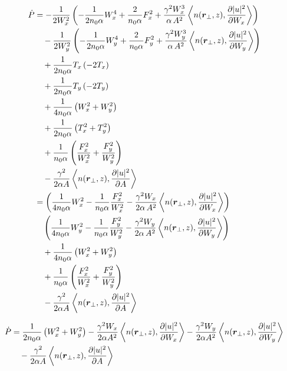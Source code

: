 \begin{equation}
\begin{split}
    \dot{P}  &= -\frac{1}{2W_{x}^2} \left(- \frac{1}{2 n_0 \alpha} W_{x}^4+ \frac{2}{n_0 \alpha} F_{x}^2  + \frac{\gamma^2 W_{x}^3}{ \alpha\, A^2}  \left<n(\mbox{\boldmath{$r$}}_{\perp},z), \frac{\partial |u|^2}{\partial W_{x}}\right>\right)  \\
    &\quad - \frac{1}{2W_{y}^2} \left(- \frac{1}{2 n_0 \alpha} W_{y}^4 + \frac{2}{n_0 \alpha} F_{y}^2  + \frac{\gamma^2 W_{y}^3}{ \alpha\, A^2}  \left<n(\mbox{\boldmath{$r$}}_{\perp},z), \frac{\partial |u|^2}{\partial W_{y}}\right>\right)\\
    &\quad + \frac{1}{2 n_0 \alpha}T_x  \left( - 2T_x \right) \\
    &\quad + \frac{1}{2 n_0 \alpha}T_y  \left( - 2T_y \right) \\
    &\quad + \frac{1}{4 n_0 \alpha}  \left(W_x^2+ W_y^2\right) \\    
    &\quad + \frac{1}{2 n_0 \alpha}  \left(T_x^2 + T_y^2 \right) \\
    &\quad + \frac{1}{n_0 \alpha}  \left(\frac{F_{x}^2}{W_{x}^2} + \frac{F_{y}^2}{W_{y}^2}\right) \\
    &\quad -  \frac{\gamma^2}{2 \alpha A} \left< n(\mbox{\boldmath{$r$}}_{\perp},z),\frac{\partial |u|^2}{\partial A}\right>   \\
    &=  \left(\frac{1}{4 n_0 \alpha} W_{x}^2 -\frac{1}{n_0 \alpha} \frac{F_{x}^2}{W_{x}^2} - \frac{\gamma^2 W_{x}}{ 2 \alpha\, A^2}  \left<n(\mbox{\boldmath{$r$}}_{\perp},z), \frac{\partial |u|^2}{\partial W_{x}}\right>\right)  \\
    &\quad\left( \frac{1}{4 n_0 \alpha} W_{y}^2 - \frac{1}{n_0 \alpha} \frac{F_{y}^2}{W_{y}^2} - \frac{\gamma^2 W_{y}}{ 2 \alpha\, A^2}  \left<n(\mbox{\boldmath{$r$}}_{\perp},z), \frac{\partial |u|^2}{\partial W_{y}}\right>\right)\\
    &\quad + \frac{1}{4 n_0 \alpha}  \left(W_x^2+ W_y^2\right) \\    
    &\quad + \frac{1}{n_0 \alpha}  \left(\frac{F_{x}^2}{W_{x}^2} + \frac{F_{y}^2}{W_{y}^2}\right) \\
    &\quad -  \frac{\gamma^2}{2 \alpha A} \left< n(\mbox{\boldmath{$r$}}_{\perp},z),\frac{\partial |u|^2}{\partial A}\right>   \\ 
\end{split}
\end{equation}


\begin{equation}
\begin{split}
    \dot{P}  &= \frac{1}{2 n_0 \alpha} \left(W_{x}^2 + W_{y}^2\right)  - \frac{\gamma^2 W_{x}}{ 2 \alpha A^2}  \left<n(\mbox{\boldmath{$r$}}_{\perp},z), \frac{\partial |u|^2}{\partial W_{x}}\right>  
    - \frac{\gamma^2 W_{y}}{ 2 \alpha A^2}  \left<n(\mbox{\boldmath{$r$}}_{\perp},z), \frac{\partial |u|^2}{\partial W_{y}}\right>\\
    &\quad -  \frac{\gamma^2}{2 \alpha A} \left< n(\mbox{\boldmath{$r$}}_{\perp},z),\frac{\partial |u|^2}{\partial A}\right> 
\end{split}
\end{equation}


